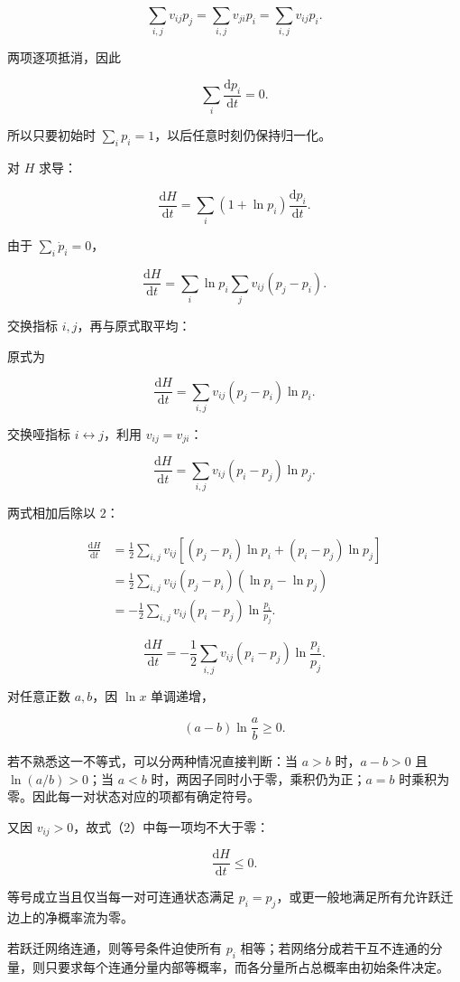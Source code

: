 \documentclass[12pt,a4paper,UTF8]{ctexart}
\begin{document}
\[\sum_{i,j}v_{ij}p_j
=\sum_{i,j}v_{ji}p_i
=\sum_{i,j}v_{ij}p_i.\]

两项逐项抵消，因此

\[\boxed{\sum_i\frac{\mathrm dp_i}{\mathrm dt}=0}.\]

所以只要初始时 \(\sum_i p_i=1\)，以后任意时刻仍保持归一化。

对 \(H\) 求导：

\[\frac{\mathrm dH}{\mathrm dt}
=\sum_i(1+\ln p_i)\frac{\mathrm dp_i}{\mathrm dt}.\]

由于 \(\sum_i\dot p_i=0\)，

\[\frac{\mathrm dH}{\mathrm dt}
=\sum_i\ln p_i\sum_jv_{ij}(p_j-p_i).\]

交换指标 \(i,j\)，再与原式取平均：

原式为

\[\frac{\mathrm dH}{\mathrm dt}
=\sum_{i,j}v_{ij}(p_j-p_i)\ln p_i.\]

交换哑指标 \(i\leftrightarrow j\)，利用 \(v_{ij}=v_{ji}\)：

\[\frac{\mathrm dH}{\mathrm dt}
=\sum_{i,j}v_{ij}(p_i-p_j)\ln p_j.\]

两式相加后除以 \(2\)：

\[\begin{aligned}
\frac{\mathrm dH}{\mathrm dt}
&=\frac12\sum_{i,j}v_{ij}
\left[(p_j-p_i)\ln p_i+(p_i-p_j)\ln p_j\right]\\
&=\frac12\sum_{i,j}v_{ij}(p_j-p_i)
\left(\ln p_i-\ln p_j\right)\\
&=-\frac12\sum_{i,j}v_{ij}(p_i-p_j)
\ln\frac{p_i}{p_j}.
\end{aligned}\]

\[\boxed{
\frac{\mathrm dH}{\mathrm dt}
=-\frac12\sum_{i,j}v_{ij}(p_i-p_j)
\ln\frac{p_i}{p_j}
}. \tag{2}\]

对任意正数 \(a,b\)，因 \(\ln x\) 单调递增，

\[(a-b)\ln\frac ab\geq0.\]

若不熟悉这一不等式，可以分两种情况直接判断：当 \(a>b\) 时，\(a-b>0\) 且
\(\ln(a/b)>0\)；当 \(a<b\) 时，两因子同时小于零，乘积仍为正；\(a=b\)
时乘积为零。因此每一对状态对应的项都有确定符号。

又因 \(v_{ij}>0\)，故式（2）中每一项均不大于零：

\[\boxed{\frac{\mathrm dH}{\mathrm dt}\leq0}.\]

等号成立当且仅当每一对可连通状态满足
\(p_i=p_j\)，或更一般地满足所有允许跃迁边上的净概率流为零。

若跃迁网络连通，则等号条件迫使所有 \(p_i\)
相等；若网络分成若干互不连通的分量，则只要求每个连通分量内部等概率，而各分量所占总概率由初始条件决定。
\end{document}
